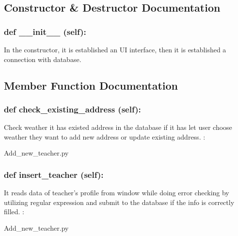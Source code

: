 \subsection{Constructor \& Destructor Documentation}
\hypertarget{class_poly_aa3def076b74bed67904976ad4f9fe9b1}{
\subsubsection[{def __init__ (self):}]{\setlength{\rightskip}{0pt plus 5cm}def {\_\_init\_\_} (self): 
}}

In the constructor, it is established an UI interface, then it is  established a connection with database.

\subsection{Member Function Documentation}

\hypertarget{class_poly_a14a7ad77ce612b0c54f531d307ee4b39}{
\subsubsection[{def check_existing_address(self):}]{\setlength{\rightskip}{0pt plus 5cm}def {check\_existing\_address} (self):}}\label{class_poly_a14a7ad77ce612b0c54f531d307ee4b39}
Check weather it has existed address in the database if it has let user choose weather they want to add new address or update existing address.
:\begin{DoxyCompactItemize}
\item 
Add\_new\_teacher.\-py\end{DoxyCompactItemize}

\hypertarget{class_poly_a14a7ad77ce612b0c54f531d307ee4b39}{
\subsubsection[{def insert_teacher(self):}]{\setlength{\rightskip}{0pt plus 5cm}def {insert\_teacher} (self):}}\label{class_poly_a14a7ad77ce612b0c54f531d307ee4b39}
It reads data of teacher's profile from window while doing error checking by utilizing regular expression and submit to the database if the info is correctly filled.
:\begin{DoxyCompactItemize}
\item 
Add\_new\_teacher.\-py\end{DoxyCompactItemize}

